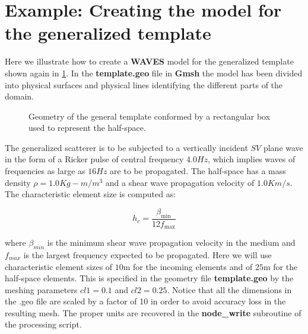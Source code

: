 \documentclass[12pt,letterpaper]{article}
\begin{document}
\section*{Example: Creating the model for the generalized template}
Here we illustrate how to create a {\bf WAVES} model for the generalized template shown again in \cref{fig:plantilla2}. In the {\bf template.geo} file in {\bf Gmsh} the model has been divided into physical surfaces and physical lines identifying the different parts of the domain.

\begin{figure}[H]
\centering
{}
\caption{Geometry of the general template conformed by a rectangular box used to represent the half-space.}
\label{fig:plantilla2}
\end{figure}


The generalized scatterer is to be subjected to a vertically incident $SV$ plane wave in the form of a Ricker pulse of central frequency $4.0 Hz$, which implies waves of frequencies as large as $16 Hz$ are to be propagated. The half-space has a mass density $\rho = 1.0 Kg-m/m^3$ and a shear wave propagation velocity of $1.0 Km/s$. The characteristic element size is computed as:

\begin{equation}
{h_c} = \frac{{{\beta _{\min }}}}{{12{f_{\max }}}}
\end{equation}

where $\beta_{min}$ is the minimum shear wave propagation velocity in the medium and $f_{max}$ is the largest frequency expected to be propagated. Here we will use characteristic element sizes  of $10$m for the incoming elements and of $25$m for the half-space elements. This is specified in the geometry file {\bf template.geo} by the meshing parameters $cl1 = 0.1$ and $cl2 = 0.25$. Notice that all the dimensions in the .geo file are scaled by a factor of 10 in order to avoid accuracy loss in the resulting mesh. The proper units are recovered in the {\bf node\_write} subroutine of the processing script.
\end{document}
